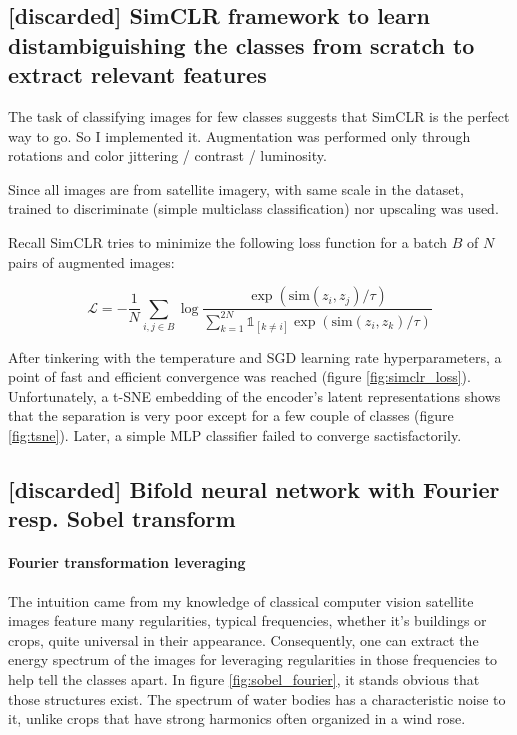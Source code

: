 \documentclass{article}
\begin{document}
\subsection{[discarded] SimCLR framework to learn distambiguishing the classes from scratch to extract relevant features}
The task of classifying images for few classes suggests that SimCLR is the perfect way to go.
So I implemented it. Augmentation was performed only through rotations and color jittering / contrast / luminosity.

Since all images are from satellite imagery, with same scale in the dataset, trained to discriminate (simple multiclass classification) nor upscaling was used.

Recall SimCLR tries to minimize the following loss function for a batch $B$ of $N$ pairs of augmented images:

\begin{equation}
    \mathcal{L} =- \frac{1}{N} \sum_{i,j\in B}\log \frac{\exp(\text{sim}(z_i,z_j)/\tau)}{\sum_{k=1}^{2N}\mathbb{1}_{[k\neq i]}\exp(\text{sim}(z_i,z_k)/\tau)}
\end{equation}



After tinkering with the temperature and SGD learning rate hyperparameters, a point of fast and efficient convergence was reached (figure \ref{fig:simclr_loss}). Unfortunately, a t-SNE embedding of the encoder's latent representations shows that the separation is very poor except for a few couple of classes (figure \ref{fig:tsne}). Later, a simple MLP classifier failed to converge sactisfactorily.




\subsection{[discarded] Bifold neural network with Fourier resp. Sobel transform}
\label{fourier_model}
\paragraph{Fourier transformation  leveraging} The intuition came from my knowledge of classical computer vision satellite images feature many regularities, typical frequencies, whether it's buildings or crops, quite universal in their appearance. Consequently, one can extract the energy spectrum of the images for leveraging regularities in those frequencies to help tell the classes apart. In figure \ref{fig:sobel_fourier}, it stands obvious that those structures exist. The spectrum of water bodies has a characteristic noise to it, unlike crops that have strong harmonics often organized in a wind rose.
\end{document}
